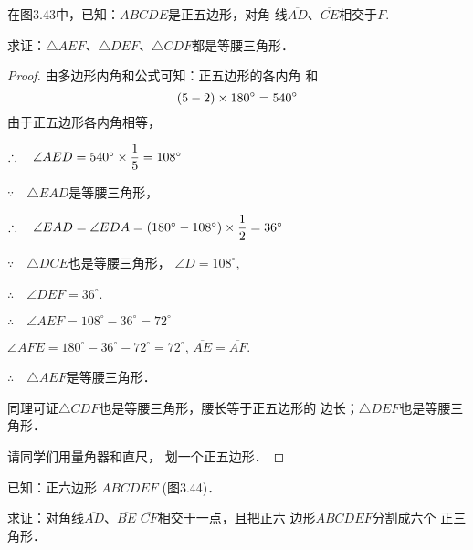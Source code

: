 \begin{example}
    在图3.43中，已知：$ABCDE$是正五边形，对角
    线$\overline{AD}$、$\overline{CE}$相交于$F$.

    求证：$\triangle AEF$、$\triangle DEF$、$\triangle CDF$都是等腰三角形．
\end{example}

\begin{proof}
由多边形内角和公式可知：正五边形的各内角
和
\[(5-2)\times180^{\circ}=540^{\circ}\]
由于正五边形各内角相等，

$\therefore\quad \angle AED=540^{\circ}\times\dfrac{1}{5}=108^{\circ}$

$\because\quad \triangle EAD$是等腰三角形，

$\therefore\quad \angle EAD=\angle EDA=(180^{\circ}-108^{\circ})\times\dfrac{1}{2}=36^{\circ}$

$\because\quad \triangle DCE$也是等腰三角形，
$\angle D=108^{\circ}$,

$\therefore\quad \angle DEF=36^{\circ}$.

$\therefore\quad \angle AEF=108^{\circ}-36^{\circ}=72^{\circ}$

$\angle AFE=180^{\circ}-36^{\circ}-72^{\circ}=72^{\circ}$, $\overline{AE}=\overline{AF}$.

$\therefore\quad \triangle AEF$是等腰三角形．

同理可证$\triangle CDF$也是等腰三角形，腰长等于正五边形的
边长；$\triangle DEF$也是等腰三角形．

请同学们用量角器和直尺，
划一个正五边形．
\end{proof}
    
\begin{example}
    已知：正六边形
    $ABCDEF$ (图3.44)．

    求证：对角线$\overline{AD}$、$\overline{BE}$
    $\overline{CF}$相交于一点，且把正六
    边形$ABCDEF$分割成六个
    正三角形．
\end{example}

\begin{figure}[htp]
    \centering
{}
    \caption{}
\end{figure}

